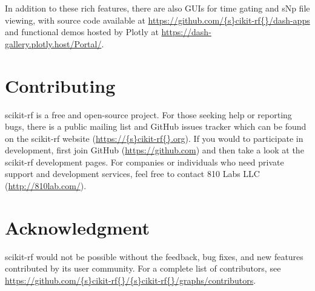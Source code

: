 \documentclass[10pt, letterpaper]{scrartcl}
\newcommand{\skrf}{{s}cikit-rf\xspace}
\begin{document}
\begin{itemize}
\end{itemize}

In addition to these rich features, there are also GUIs for time gating and sNp file viewing, with source code available at \url{https://github.com/\skrf{}/dash-apps} and functional demos hosted by Plotly at \url{https://dash-gallery.plotly.host/Portal/}. 

\section{Contributing}
\skrf{} is a free and open-source project. For those seeking help or reporting bugs, there is a public mailing list and GitHub issues tracker which can be found on the \skrf{} website (\url{https://\skrf{}.org}). If you would to participate in development, first join GitHub (\url{https://github.com}) and then take a look at the \skrf{} development pages. For companies or individuals who need private support and development services, feel free to contact 810 Labs LLC (\url{http://810lab.com/}).

\section*{Acknowledgment}
\skrf{} would not be possible without the feedback, bug fixes, and new features contributed by its user community. For a complete list of contributors, see \url{https://github.com/\skrf{}/\skrf{}/graphs/contributors}.



\end{document}
